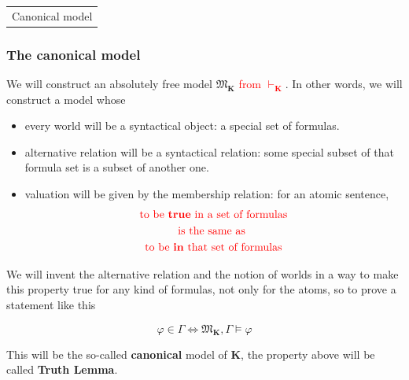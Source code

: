 \documentclass[xcolor=x11names]{beamer}
\makeatletter
\let\beamer@writeslidentry@miniframeson=\beamer@writeslidentry
\def\beamer@writeslidentry@miniframesoff{%
  \expandafter\beamer@ifempty\expandafter{\beamer@framestartpage}{}%
  {%
    \clearpage\beamer@notesactions%
  }
}
\newcommand*{\miniframeson}{\let\beamer@writeslidentry=\beamer@writeslidentry@miniframeson}
\newcommand*{\miniframesoff}{\let\beamer@writeslidentry=\beamer@writeslidentry@miniframesoff}
\newcommand{\cimdia}[1] {\miniframesoff \begin{frame}\begin{center}\huge \begin{tabular}{c}#1\end{tabular}\end{center}\end{frame}\miniframeson}
\newcommand{\cemph}[1]{\textcolor{red}{#1}}
\renewcommand{\emph}[1]{\textbf{#1}}
\makeatother
\begin{document}


\cimdia{Canonical model}

\begin{frame}
\frametitle{The canonical model}
We will construct an absolutely free model $\mathfrak M_\mathbf K$ \cemph{ from $\vdash_\mathbf{K}$}. In other words, we will construct a model whose
\begin{itemize}
\item every world will be a syntactical object: a special set of formulas.
\item alternative relation will be a syntactical relation: some special subset of that formula set is a subset of another one.
\item valuation will be given by the membership relation: for an atomic sentence,
\begin{multline*}
\textup{\cemph{to be \emph{true} in a set of formulas}} \\ \textup{\cemph{ is the same as }} \\ \textup{ \cemph{to be \emph{in} that set of formulas }}\end{multline*}
\end{itemize}
We will invent the alternative relation and the notion of worlds in a way to make this property true for any kind of formulas, not only for the atoms, so to prove a statement like this

\[ \varphi \in \Gamma \iff \mathfrak M_{\mathbf K}, \Gamma \models \varphi \]

This will be the so-called \emph{canonical} model of $\mathbf K$, the property above will be called \emph{Truth Lemma}.

\end{frame}


\end{document}
